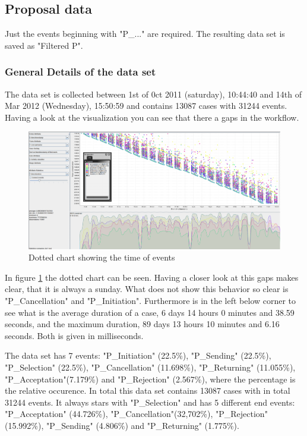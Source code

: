 \subsection{Proposal data}
Just the events beginning with "P\_..." are required. The resulting data set is saved as "Filtered P".

\subsubsection{General Details of the data set}
The data set is collected between 1st of 0ct 2011 (saturday), 10:44:40 and 14th of Mar 2012 (Wednesday), 15:50:59 and contains 13087 cases with 31244 events. Having a look at the visualization you can see that there a gaps in the workflow. 

\begin{figure}[!htbp]
\centering
\includegraphics[height = 0.2\textheight]{ProposalData.PNG}
\caption{Dotted chart showing the time of events}
\label{fig:PropTimeFlow}
\end{figure}

In figure \ref{fig:PropTimeFlow} the dotted chart can be seen. Having a closer look at this gaps makes clear, that it is always a sunday. What does not show this behavior so clear is "P\_Cancellation" and "P\_Initiation". Furthermore is in the left below corner to see what is the average duration of a case, 6 days 14 hours 0 minutes and 38.59 seconds, and the maximum duration, 89 days 13 hours 10 minutes and 6.16 seconds. Both is given in milliseconds.

The data set has 7 events: "P\_Initiation" (22.5\%), 
"P\_Sending" (22.5\%), "P\_Selection" (22.5\%), "P\_Cancellation" (11.698\%), "P\_Returning" (11.055\%), "P\_Acceptation"(7.179\%) and "P\_Rejection" (2.567\%), where the percentage is the relative occurence. In total this data set contains 13087 cases with in total 31244 events. It always stars with "P\_Selection" and has 5 different end events: "P\_Acceptation" (44.726\%), "P\_Cancellation"(32,702\%), "P\_Rejection" (15.992\%), "P\_Sending" (4.806\%) and "P\_Returning" (1.775\%).

